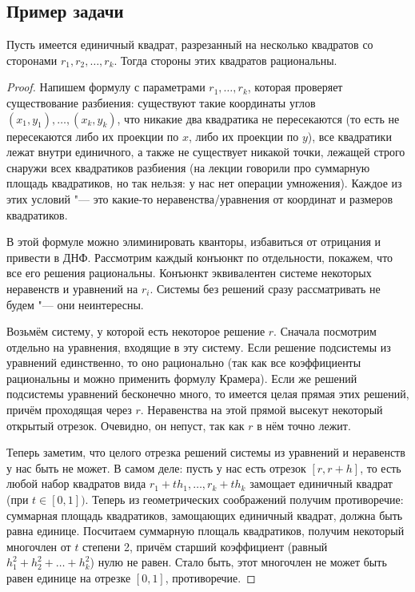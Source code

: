 \subsection{Пример задачи}
\begin{theorem}
	Пусть имеется единичный квадрат, разрезанный на несколько квадратов со сторонами $r_1, r_2, \dots, r_k$.
	Тогда стороны этих квадратов рациональны.
\end{theorem}
\begin{proof}
	Напишем формулу с параметрами $r_1, \dots, r_k$, которая проверяет существование разбиения: существуют такие координаты углов $(x_1, y_1), \dots, (x_k, y_k)$,
	что никакие два квадратика не пересекаются (то есть не пересекаются либо их проекции по $x$, либо их проекции по $y$), все квадратики лежат внутри единичного,
	а также не существует никакой точки, лежащей строго снаружи всех квадратиков разбиения (на лекции говорили про суммарную площадь квадратиков,
	но так нельзя: у нас нет операции умножения).
	Каждое из этих условий "--- это какие-то неравенства/уравнения от координат и размеров квадратиков.

	В этой формуле можно элиминировать кванторы, избавиться от отрицания и привести в ДНФ.
	Рассмотрим каждый конъюнкт по отдельности, покажем, что все его решения рациональны.
	Конъюнкт эквивалентен системе некоторых неравенств и уравнений на $r_i$.
	Системы без решений сразу рассматривать не будем "--- они неинтересны.

	Возьмём систему, у которой есть некоторое решение $r$.
	Сначала посмотрим отдельно на уравнения, входящие в эту систему.
	Если решение подсистемы из уравнений единственно, то оно рационально (так как все коэффициенты рациональны и можно применить формулу Крамера).
	Если же решений подсистемы уравнений бесконечно много, то имеется целая прямая этих решений, причём проходящая через $r$.
	Неравенства на этой прямой высекут некоторый открытый отрезок.
	Очевидно, он непуст, так как $r$ в нём точно лежит.

	Теперь заметим, что целого отрезка решений системы из уравнений и неравенств у нас быть не может.
	В самом деле: пусть у нас есть отрезок $[r, r+h]$, то есть любой набор квадратов вида $r_1 + th_1, \dots, r_k + th_k$
	замощает единичный квадрат (при $t \in [0, 1])$.
	Теперь из геометрических соображений получим противоречие:
	суммарная площадь квадратиков, замощающих единичный квадрат, должна быть равна единице.
	Посчитаем суммарную площаль квадратиков, получим некоторый многочлен от $t$ степени 2, причём старший коэффициент (равный $h_1^2+h_2^2+\dots+h_k^2$) нулю не равен.
	Стало быть, этот многочлен не может быть равен единице на отрезке $[0, 1]$, противоречие.
\end{proof}
